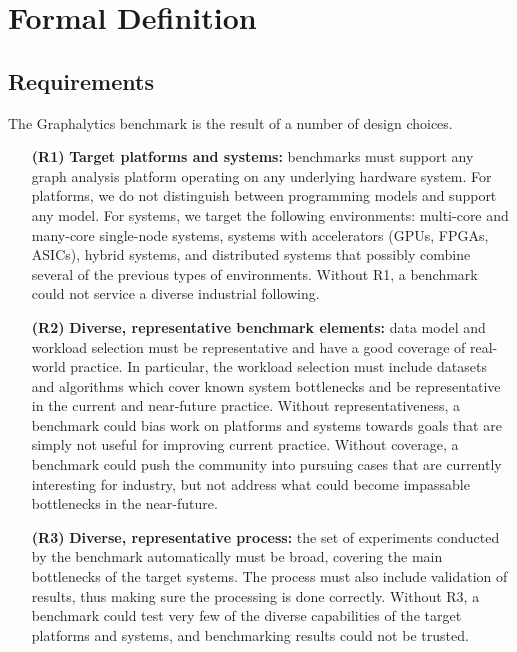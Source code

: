 \chapter{Formal Definition}
\label{chap:definition}

\section{Requirements}
\label{sec:requirements}
The Graphalytics benchmark is the result of a number of design choices.

\begin{itemize}
\item[\textbf{(R1)}] \textbf{Target platforms and systems:} benchmarks must support any graph analysis platform operating on any underlying hardware system. For platforms, we do not distinguish between programming models and support any model. For systems, we target the following environments: 
multi-core and many-core single-node systems, systems with accelerators (GPUs, FPGAs, ASICs), hybrid systems, and distributed systems that possibly combine several of the previous types of environments.
Without R1, a benchmark could not service a diverse industrial following.

\item[\textbf{(R2)}] \textbf{Diverse, representative benchmark elements:} data model and workload selection must be representative and have a good coverage of real-world practice. In particular, the workload selection must include datasets and algorithms which cover known system bottlenecks and be representative in the current and near-future practice. Without representativeness, a benchmark could bias work on platforms and systems towards goals that are simply not useful for improving current practice. Without coverage, a benchmark could push the community into pursuing cases that are currently interesting for industry, but not address what could become impassable bottlenecks in the near-future.

\item[\textbf{(R3)}] \textbf{Diverse, representative process:} the set of experiments conducted by the benchmark automatically must be broad, covering the main bottlenecks of the target systems.  The process must also include validation of results, thus making sure the processing is done correctly. Without R3, a benchmark could test very few of the diverse capabilities of the target platforms and systems, and benchmarking results could not be trusted.


\end{itemize}
